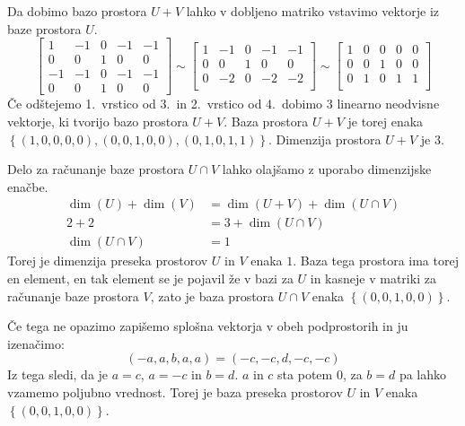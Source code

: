 \documentclass[a4,11pt]{article}
\begin{document}
    Da dobimo bazo prostora \(U + V\) lahko v dobljeno matriko vstavimo vektorje iz baze prostora \(U\).
    \[
        \begin{bmatrix}
            1 & -1 & 0 & -1 & -1 \\
            0 & 0 & 1 & 0 & 0 \\
            -1 & -1 & 0 & -1 & -1 \\
            0 & 0 & 1 & 0 & 0
        \end{bmatrix} \sim \begin{bmatrix}
            1 & -1 & 0 & -1 & -1 \\
            0 & 0 & 1 & 0 & 0 \\
            0 & -2 & 0 & -2 & -2 \\
            \ 
        \end{bmatrix} \sim \begin{bmatrix}
            1 & 0 & 0 & 0 & 0 \\
            0 & 0 & 1 & 0 & 0 \\
            0 & 1 & 0 & 1 & 1 \\
            \
        \end{bmatrix}
    \]
    Če odštejemo 1.~vrstico od 3.~in 2.~vrstico od 4.~dobimo 3 linearno neodvisne vektorje, ki tvorijo bazo prostora \(U + V\).
    Baza prostora \(U + V\) je torej enaka \(\left\{\left(1, 0, 0, 0, 0\right), \left(0, 0, 1, 0, 0\right), \left(0, 1, 0, 1, 1\right)\right\}\).
    Dimenzija prostora \(U + V\) je \(3\).

    Delo za računanje baze prostora \(U \cap V\) lahko olajšamo z uporabo dimenzijske enačbe.
    \begin{align*}
        \dim\left(U\right) + \dim\left(V\right) & = \dim\left(U + V\right) + \dim\left(U \cap V\right) \\
        2 + 2 & = 3 + \dim\left(U \cap V\right) \\
        \dim\left(U \cap V\right) & = 1
    \end{align*}
    Torej je dimenzija preseka prostorov \(U\) in \(V\) enaka \(1\). Baza tega prostora ima torej en element,
    en tak element se je pojavil že v bazi za \(U\) in kasneje v matriki za računanje baze prostora \(V\),
    zato je baza prostora \(U \cap V\) enaka \(\left\{(0, 0, 1, 0, 0)\right\}\).

    Če tega ne opazimo zapišemo splošna vektorja v obeh podprostorih in ju izenačimo:
    \[
        \left(-a, a, b, a, a\right) = \left(-c, -c, d, -c, -c\right)
    \]
    Iz tega sledi, da je \(a = c\), \(a = -c\) in \(b = d\). \(a\) in \(c\) sta potem \(0\),
    za \(b = d\) pa lahko vzamemo poljubno vrednost. Torej je baza preseka prostorov \(U\) in \(V\) enaka
    \(\left\{(0, 0, 1, 0, 0)\right\}\).
\end{document}
